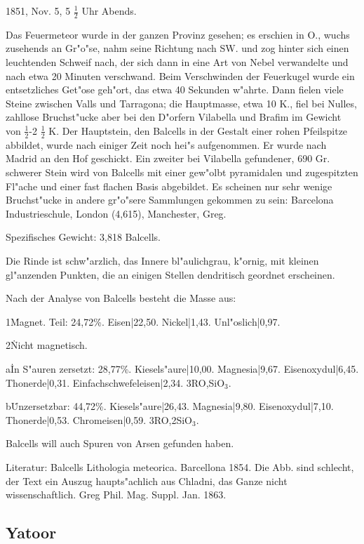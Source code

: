 \documentclass[a4paper, 11pt, oneside]{article}
\begin{document}
1851, Nov. 5, 5 $\frac{1}{2}$ Uhr Abends.

Das Feuermeteor wurde in der ganzen Provinz gesehen; es erschien in O., wuchs zusehends an Gr"o"se, nahm seine Richtung nach SW. und zog hinter sich einen leuchtenden Schweif nach, der sich dann in eine Art von Nebel verwandelte und nach etwa 20 Minuten verschwand. Beim Verschwinden der Feuerkugel wurde ein entsetzliches Get"ose geh"ort, das etwa 40 Sekunden w"ahrte. Dann fielen viele Steine zwischen Valls und Tarragona; die Hauptmasse, etwa 10 K., fiel bei Nulles, zahllose Bruchst"ucke aber bei den D"orfern Vilabella und Brafim im Gewicht von $\frac{1}{2}$-2 $\frac{1}{2}$ K. Der Hauptstein, den Balcells in der Gestalt einer rohen Pfeilspitze abbildet, wurde nach einiger Zeit noch hei"s aufgenommen. Er wurde nach Madrid an den Hof geschickt. Ein zweiter bei Vilabella gefundener, 690 Gr. schwerer Stein wird von Balcells mit einer gew"olbt pyramidalen und zugespitzten Fl"ache und einer fast flachen Basis abgebildet. Es scheinen nur sehr wenige Bruchst"ucke in andere gr"o"sere Sammlungen gekommen zu sein: Barcelona Industrieschule, London (4,615), Manchester, Greg.

Spezifisches Gewicht: 3,818 Balcells.

Die Rinde ist schw"arzlich, das Innere bl"aulichgrau, k"ornig, mit kleinen gl"anzenden Punkten, die an einigen Stellen dendritisch geordnet erscheinen.

Nach der Analyse von Balcells besteht die Masse aus:

1\. Magnet. Teil: 24,72\%.  
Eisen|22,50.  
Nickel|1,43.  
Unl"oslich|0,97.

2\. Nicht magnetisch.

a\. In S"auren zersetzt: 28,77\%.  
Kiesels"aure|10,00.  
Magnesia|9,67.  
Eisenoxydul|6,45.  
Thonerde|0,31.  
Einfachschwefeleisen|2,34.  
3RO,SiO$_{3}$.

b\. Unzersetzbar: 44,72\%.  
Kiesels"aure|26,43.  
Magnesia|9,80.  
Eisenoxydul|7,10.  
Thonerde|0,53.  
Chromeisen|0,59.  
3RO,2SiO$_{3}$.

Balcells will auch Spuren von Arsen gefunden haben.

\footnotesize
Literatur: Balcells Lithologia meteorica. Barcellona 1854. Die Abb. sind schlecht, der Text ein Auszug haupts"achlich aus Chladni, das Ganze nicht wissenschaftlich. Greg Phil. Mag. Suppl. Jan. 1863.

\subsection{Yatoor}
\normalsize
\end{document}
